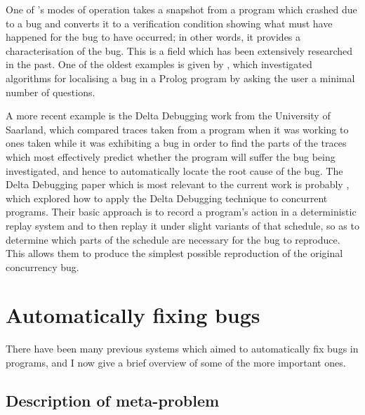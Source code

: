 One of {\implementation}'s modes of operation takes a snapshot from a
program which crashed due to a bug and converts it to a verification
condition showing what must have happened for the bug to have
occurred; in other words, it provides a characterisation of the bug.
This is a field which has been extensively researched in the past.
One of the oldest examples is given by , which
investigated algorithms for localising a bug in a Prolog program by
asking the user a minimal number of questions.

A more recent example is the Delta Debugging work from the University of Saarland, which compared
traces taken from a program when it was working to ones taken while it
was exhibiting a bug in order to find the parts of the traces which
most effectively predict whether the program will suffer the bug being
investigated, and hence to automatically locate the root cause of the
bug.  The Delta Debugging paper which is most relevant to the current
work is probably , which explored
how to apply the Delta Debugging technique to concurrent programs.
Their basic approach is to record a program's action in a
deterministic replay system and to then replay it under slight
variants of that schedule, so as to determine which parts of the
schedule are necessary for the bug to reproduce.  This allows them to
produce the simplest possible reproduction of the original concurrency
bug.  

\section{Automatically fixing bugs}


There have been many previous systems which aimed to automatically fix
bugs in programs, and I now give a brief overview of some of the more
important ones.

\subsection{Description of meta-problem}


